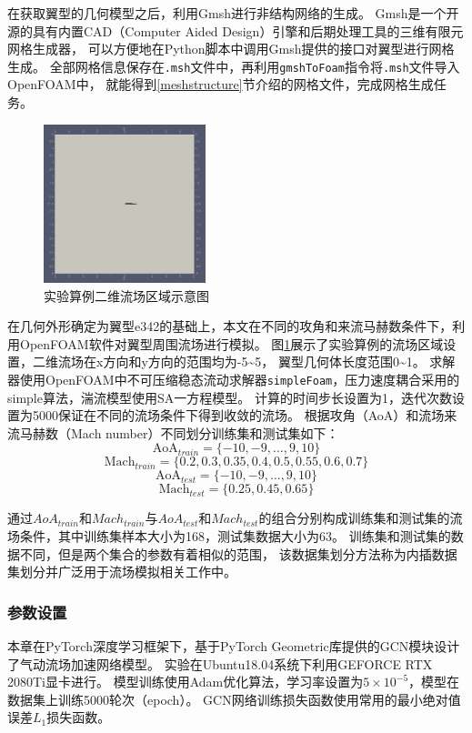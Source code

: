 在获取翼型的几何模型之后，利用Gmsh\cite{gmsh}进行非结构网络的生成。
Gmsh是一个开源的具有内置CAD（Computer Aided Design）引擎和后期处理工具的三维有限元网格生成器，
可以方便地在Python脚本中调用Gmsh提供的接口对翼型进行网格生成。
全部网格信息保存在\texttt{.msh}文件中，再利用\texttt{gmshToFoam}指令将\texttt{.msh}文件导入OpenFOAM中，
就能得到\ref{meshstructure}节介绍的网格文件，完成网格生成任务。

\begin{figure}[htp]
	\centering
	\includegraphics[width=0.42\textwidth]{figures/flowfield.png}
	\caption{实验算例二维流场区域示意图}
	\label{fig:field}
\end{figure}

在几何外形确定为翼型e342的基础上，本文在不同的攻角和来流马赫数条件下，利用OpenFOAM软件对翼型周围流场进行模拟。
图\ref{fig:field}展示了实验算例的流场区域设置，二维流场在x方向和y方向的范围均为-5\textasciitilde5，
翼型几何体长度范围0\textasciitilde1。
求解器使用OpenFOAM中不可压缩稳态流动求解器\texttt{simpleFoam}，压力速度耦合采用的simple算法，湍流模型使用SA一方程模型。
计算的时间步长设置为1，迭代次数设置为5000保证在不同的流场条件下得到收敛的流场。
根据攻角（AoA）和流场来流马赫数（Mach  number）不同划分训练集和测试集如下：
$$\text {AoA}_{train} =\{-10,-9, \ldots, 9,10\}$$
$$\text {Mach}_{train} =\{0.2, 0.3, 0.35, 0.4, 0.5, 0.55, 0.6, 0.7\}$$
$$\text {AoA}_{test} =\{-10,-9, \ldots, 9,10\}$$
$$\text {Mach}_{test} =\{0.25, 0.45, 0.65\}$$

通过${AoA}_{train}$和${Mach}_{train}$与${AoA}_{test}$和${Mach}_{test}$的组合分别构成训练集和测试集的流场条件，其中训练集样本大小为168，测试集数据大小为63。
训练集和测试集的数据不同，但是两个集合的参数有着相似的范围，
该数据集划分方法称为内插数据集划分并广泛用于流场模拟相关工作中\cite{bhatnagar2019prediction,DBLP:conf/kdd/GuoLI16}。

\subsubsection{参数设置}
本章在PyTorch深度学习框架下，基于PyTorch Geometric库提供的GCN模块设计了气动流场加速网络模型。
实验在Ubuntu18.04系统下利用GEFORCE RTX 2080Ti显卡进行。
模型训练使用Adam优化算法，学习率设置为$5\times10^{-5}$，模型在数据集上训练5000轮次（epoch）。
GCN网络训练损失函数使用常用的最小绝对值误差$L_1$损失函数。

